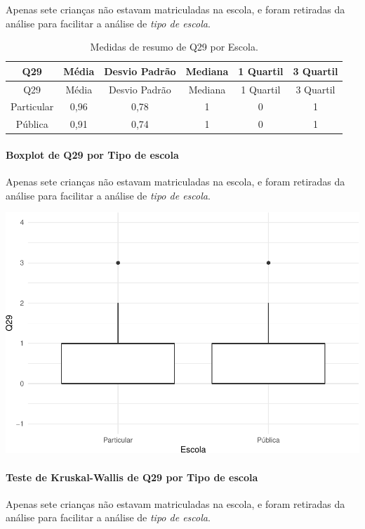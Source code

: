 \documentclass[]{article}
\let\oldparagraph\paragraph
\renewcommand{\paragraph}[1]{\oldparagraph{#1}\mbox{}}
\begin{document}
Apenas sete crianças não estavam matriculadas na escola, e foram retiradas da análise para facilitar a análise de \emph{tipo de escola}.

\begin{longtable}[]{@{}cccccc@{}}
\caption{\label{tab:unnamed-chunk-942}Medidas de resumo de Q29 por Escola.}\tabularnewline
\toprule
Q29 & Média & Desvio Padrão & Mediana & 1 Quartil & 3 Quartil\tabularnewline
\midrule
\endfirsthead
\toprule
Q29 & Média & Desvio Padrão & Mediana & 1 Quartil & 3 Quartil\tabularnewline
\midrule
\endhead
Particular & 0,96 & 0,78 & 1 & 0 & 1\tabularnewline
Pública & 0,91 & 0,74 & 1 & 0 & 1\tabularnewline
\bottomrule
\end{longtable}

\hypertarget{boxplot-de-q29-por-tipo-de-escola}{%
\paragraph{Boxplot de Q29 por Tipo de escola}\label{boxplot-de-q29-por-tipo-de-escola}}

Apenas sete crianças não estavam matriculadas na escola, e foram retiradas da análise para facilitar a análise de \emph{tipo de escola}.

\begin{center}\includegraphics[width=0.75\linewidth]{relatorio_covid19_files/figure-latex/unnamed-chunk-943-1} \end{center}

\hypertarget{teste-de-kruskal-wallis-de-q29-por-tipo-de-escola}{%
\paragraph{Teste de Kruskal-Wallis de Q29 por Tipo de escola}\label{teste-de-kruskal-wallis-de-q29-por-tipo-de-escola}}

Apenas sete crianças não estavam matriculadas na escola, e foram retiradas da análise para facilitar a análise de \emph{tipo de escola}.
\end{document}
